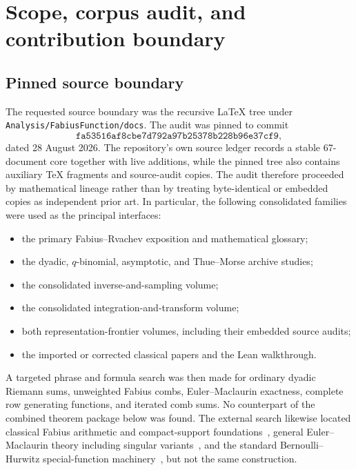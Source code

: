 \documentclass[11pt,oneside]{article}
\numberwithin{equation}{section}
\theoremstyle{definition}
\theoremstyle{remark}
\newcommand{\repo}{\texttt{Analysis/FabiusFunction/docs}}
\begin{document}
\tableofcontents
\clearpage

\section{Scope, corpus audit, and contribution boundary}
\label{sec:scope}

\subsection{Pinned source boundary}

The requested source boundary was the recursive LaTeX tree under \repo{}.  The audit was
pinned to commit
\[
 \texttt{fa53516af8cbe7d792a97b25378b228b96e37cf9},
\]
dated 28 August 2026.  The repository's own source ledger records a stable 67-document
core together with live additions, while the pinned tree also contains auxiliary TeX
fragments and source-audit copies.  The audit therefore proceeded by mathematical
lineage rather than by treating byte-identical or embedded copies as independent prior
art.  In particular, the following consolidated families were used as the principal
interfaces:
\begin{itemize}
\item the primary Fabius--Rvachev exposition and mathematical glossary;
\item the dyadic, \(q\)-binomial, asymptotic, and Thue--Morse archive studies;
\item the consolidated inverse-and-sampling volume;
\item the consolidated integration-and-transform volume;
\item both representation-frontier volumes, including their embedded source audits;
\item the imported or corrected classical papers and the Lean walkthrough.
\end{itemize}

A targeted phrase and formula search was then made for ordinary dyadic Riemann sums,
unweighted Fabius combs, Euler--Maclaurin exactness, complete row generating functions,
and iterated comb sums.  No counterpart of the combined theorem package below was found.
The external search likewise located classical Fabius arithmetic and compact-support
foundations~\cite{Arias1982,AriasArithmetic}, general Euler--Maclaurin theory including
singular variants~\cite{BerlineVergne,BuchheitKessler}, and the standard Bernoulli--Hurwitz
special-function machinery~\cite{NIST}, but not the same construction.
\end{document}
